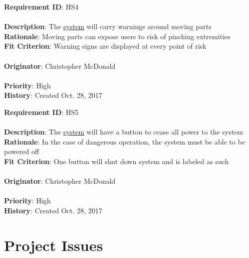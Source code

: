 \documentclass[11pt]{article}
\begin{document}
\begin{framed}
	\noindent\textbf{Requirement ID}: HS4 \hfill\\\\
	\noindent\textbf{Description}: The \hyperref[sec:definitions]{system} will carry warnings around moving parts \\
	\textbf{Rationale}: Moving parts can expose users to risk of pinching extremities \\
	\textbf{Fit Criterion}: Warning signs are displayed at every point of risk \\\\
	\textbf{Originator}: Christopher McDonald \\\\
	\textbf{Priority}: High \hfill \\
	\noindent\textbf{History}: Created Oct. 28, 2017
\end{framed}

\begin{framed}
	\noindent\textbf{Requirement ID}: HS5 \hfill\\\\
	\noindent\textbf{Description}: The \hyperref[sec:definitions]{system} will have a button to cease all power to the system \\
	\textbf{Rationale}: In the case of dangerous operation, the system must be able to be powered off \\
	\textbf{Fit Criterion}: One button will shut down system and is labeled as such \\\\
	\textbf{Originator}: Christopher McDonald \\\\
	\textbf{Priority}: High \hfill \\
	\noindent\textbf{History}: Created Oct. 28, 2017
\end{framed}

\section{Project Issues}
\end{document}
